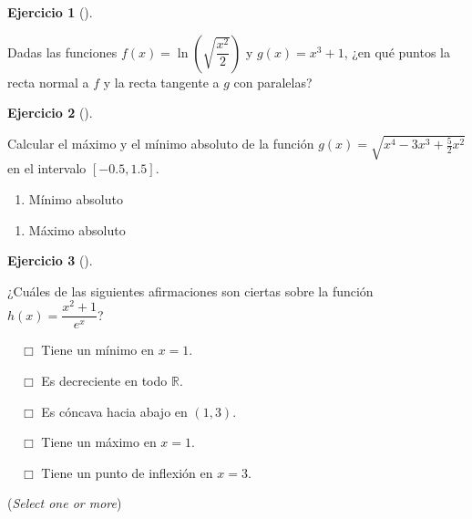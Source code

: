 \documentclass[
  a4paper,
]{scrreport}
\providecommand{\tightlist}{%
  \setlength{\itemsep}{0pt}\setlength{\parskip}{0pt}}\usepackage{longtable,booktabs,array}
\theoremstyle{definition}
\newtheorem{exercise}{Ejercicio}[chapter]
\theoremstyle{remark}
\begin{document}
\leavevmode{}%
\begin{exercise}[]\label{exr-pendientes-tangentes}

Dadas las funciones \(f(x)=\ln\left(\sqrt{\dfrac{x^2}{2}}\right)\) y
\(g(x)=x^3+1\), ¿en qué puntos la recta normal a \(f\) y la recta
tangente a \(g\) con paralelas?

\vspace{18pt}

\end{exercise}

\leavevmode{}%
\begin{exercise}[]\label{exr-extremos-absolutos}

Calcular el máximo y el mínimo absoluto de la función
\(g(x)=\sqrt{x^4-3x^3+\frac{5}{2}x^2}\) en el intervalo \([-0.5,1.5]\).

\begin{enumerate}
\def\labelenumi{\alph{enumi}.}
\tightlist
\item
  Mínimo absoluto
\end{enumerate}

\vspace{18pt}

\begin{enumerate}
\def\labelenumi{\alph{enumi}.}
\setcounter{enumi}{1}
\tightlist
\item
  Máximo absoluto
\end{enumerate}

\vspace{18pt}

\end{exercise}

\leavevmode{}%
\begin{exercise}[]\label{exr-extremos-puntos-inflexion}

¿Cuáles de las siguientes afirmaciones son ciertas sobre la función
\(h(x)=\dfrac{x^2+1}{e^x}\)?

${\quad\Box}$ Tiene un mínimo en $x=1$.

${\quad\Box}$ Es decreciente en todo $\mathbb{R}$.

${\quad\Box}$ Es cóncava hacia abajo en $(1,3)$.

${\quad\Box}$ Tiene un máximo en $x=1$.

${\quad\Box}$ Tiene un punto de inflexión en $x=3$.

(\emph{Select one or more})

\end{exercise}
\end{document}
